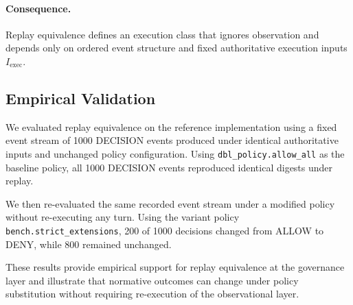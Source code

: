\paragraph{Consequence.}
Replay equivalence defines an execution class that ignores observation and depends only on ordered event structure and fixed authoritative execution inputs $I_{\text{exec}}$.

\subsection{Empirical Validation}
\label{sec:evaluation}

We evaluated replay equivalence on the reference implementation using a fixed
event stream of 1000 DECISION events produced under identical authoritative
inputs and unchanged policy configuration. Using \texttt{dbl\_policy.allow\_all}
as the baseline policy, all 1000 DECISION events reproduced identical digests
under replay.

We then re-evaluated the same recorded event stream under a modified policy
without re-executing any turn. Using the variant policy
\texttt{bench.strict\_extensions}, 200 of 1000 decisions changed from ALLOW to
DENY, while 800 remained unchanged.

These results provide empirical support for replay equivalence at the
governance layer and illustrate that normative outcomes can change under
policy substitution without requiring re-execution of the observational layer.
